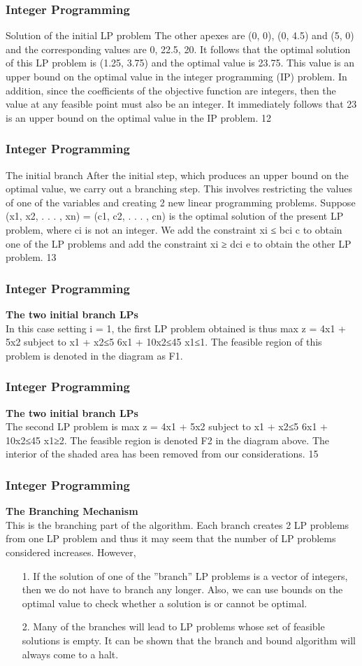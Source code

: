 \begin{frame} \frametitle{Integer Programming}     
Solution of the initial LP problem
The other apexes are (0, 0), (0, 4.5) and (5, 0) and the
corresponding values are 0, 22.5, 20.
It follows that the optimal solution of this LP problem is (1.25,
3.75) and the optimal value is 23.75. This value is an upper bound
on the optimal value in the integer programming (IP) problem.
In addition, since the coefficients of the objective function are
integers, then the value at any feasible point must also be an
integer. It immediately follows that 23 is an upper bound on the
optimal value in the IP problem.
12 \end{frame}  \begin{frame} \frametitle{Integer Programming}     
The initial branch
After the initial step, which produces an upper bound on the
optimal value, we carry out a branching step.
This involves restricting the values of one of the variables and
creating 2 new linear programming problems.
Suppose (x1, x2, . . . , xn) = (c1, c2, . . . , cn) is the optimal solution
of the present LP problem, where ci
is not an integer.
We add the constraint xi ≤ bci c to obtain one of the LP problems
and add the constraint xi ≥ dci e to obtain the other LP problem.
13 
\end{frame}  
\begin{frame} 
\frametitle{Integer Programming}     
\noindent \textbf{The two initial branch LPs}\\

In this case setting i = 1, the first LP problem obtained is thus
max z = 4x1 + 5x2
subject to
x1 + x2≤5
6x1 + 10x2≤45
x1≤1.
The feasible region of this problem is denoted in the diagram as F1.
\end{frame}  
\begin{frame} 
\frametitle{Integer Programming}     
\noindent \textbf{The two initial branch LPs}\\
The second LP problem is
max z = 4x1 + 5x2
subject to
x1 + x2≤5
6x1 + 10x2≤45
x1≥2.
The feasible region is denoted F2 in the diagram above.
The interior of the shaded area has been removed from our
considerations.
15 
\end{frame}  
\begin{frame} 
\frametitle{Integer Programming}     
\noindent \textbf{The Branching Mechanism}\\

This is the branching part of the algorithm. Each branch creates 2
LP problems from one LP problem and thus it may seem that the
number of LP problems considered increases. However,
\begin{itemize}
\item[1.] If the solution of one of the ”branch” LP problems is
a vector of integers, then we do not have to branch
any longer. Also, we can use bounds on the optimal
value to check whether a solution is or cannot be
optimal.
\item[2.] Many of the branches will lead to LP problems whose
set of feasible solutions is empty.
It can be shown that the branch and bound algorithm will always
come to a halt.
\end{itemize}
\end{frame}  
